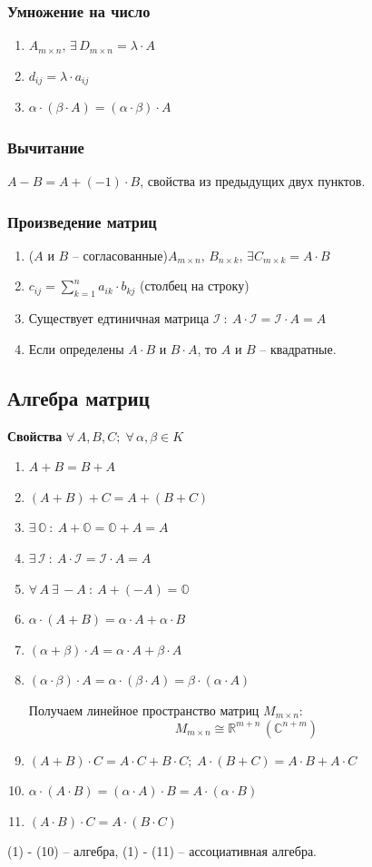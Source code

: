 \documentclass{article}
\newcommand{\R}{\mathbb R}
\begin{document}
\subsubsection{Умножение на число}
\begin{enumerate}
    \item $A_{m\times n},\,\exists\,D_{m\times n}=\lambda\cdot A$
    \item $d_{ij}=\lambda\cdot a_{ij}$
    \item $\alpha\cdot(\beta\cdot A)=(\alpha\cdot\beta)\cdot A$
\end{enumerate}
\subsubsection{Вычитание}
	$A - B = A + (-1)\cdot B$, свойства из предыдущих двух пунктов.
\subsubsection{Произведение матриц}
\begin{enumerate}
    \item ($A$ и $B$ -- согласованные)$A_{m\times n},\,B_{n\times k},\,\exists C_{m\times k}=A\cdot B$
    \item $c_{ij}=\sum\limits_{k=1}^n a_{ik}\cdot b_{kj}$ (столбец на строку)
    \item Существует едтиничная матрица $\mathcal{I}\::\:A\cdot \mathcal{I} = \mathcal{I} \cdot A =A$
    \item Если определены $A\cdot B$ и $B\cdot A$, то $A$ и $B$ -- квадратные.
\end{enumerate}
\newpage
\subsection{Алгебра матриц}
\textbf{Свойства} $\forall\,A,B,C;\;\forall\,\alpha,\beta\in K$
\begin{enumerate}
    \item $A+B=B+A$
    \item $(A+B)+C=A+(B+C)$
    \item $\exists\,\mathbb{O}\::\:A+\mathbb{O}= \mathbb{O} + A = A$
    \item $\exists\, \mathcal{I}\::\:A\cdot \mathcal{I}=\mathcal{I} \cdot A = A$
    \item $\forall\,A\:\exists \,-A\::\:A+(-A)=\mathbb{O}$
    \item $\alpha\cdot(A+B)=\alpha\cdot A+\alpha\cdot B$
    \item $(\alpha+\beta)\cdot A=\alpha\cdot A+\beta\cdot A$
    \item $(\alpha\cdot\beta)\cdot A=\alpha\cdot(\beta\cdot A)=\beta\cdot(\alpha\cdot A)$
    
    Получаем линейное пространство матриц $M_{m\times n}$:
    $$ M_{m\times n}\cong\R^{m+n}\,(\mathbb{C}^{n+m}) $$
    \item $(A+B)\cdot C=A\cdot C+B\cdot C;\;A\cdot
    (B+C)=A\cdot B+A\cdot C$
    \item $\alpha\cdot(A\cdot B)=(\alpha\cdot A)\cdot B=A\cdot(\alpha\cdot B)$
    \item $(A\cdot B)\cdot C=A\cdot(B\cdot C)$
\end{enumerate}
(1) - (10) -- алгебра, (1) - (11) -- ассоциативная алгебра.
\newpage
\end{document}
